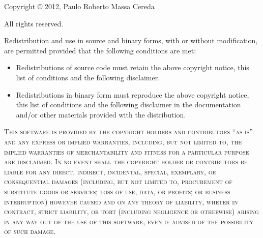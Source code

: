 \documentclass[a4paper,twoside,12pt]{memoir}
\begin{document}
\begin{infobox}[skipabove=\baselineskip plus 2pt minus 1pt]

\vspace{.5em}

\noindent Copyright \copyright{} 2012, Paulo Roberto Massa Cereda

\noindent All rights reserved.

\vspace{1em}

\noindent Redistribution and use in source and binary forms, with or without
modification, are permitted provided that the following conditions are met:

\begin{itemize}
\item Redistributions of source code must retain the above copyright notice, 
      this list of conditions and the following disclaimer.
\item Redistributions in binary form must reproduce the above copyright notice,
      this list of conditions and the following disclaimer in the documentation 
      and/or other materials provided with the distribution.
\end{itemize}

\vspace{1em}

\noindent\textsc{This software is provided by the copyright holders and 
contributors ``as is'' and any express or implied warranties, including, but not 
limited to, the implied warranties of merchantability and fitness for a 
particular purpose are disclaimed. In no event shall the copyright holder or 
contributors be liable for any direct, indirect, incidental, special, exemplary, 
or consequential damages (including, but not limited to, procurement of 
substitute goods or services; loss of use, data, or profits; or business 
interruption) however caused and on any theory of liability, wheter in contract, 
strict liability, or tort (including negligence or otherwise) arising in any way 
out of the use of this software, even if advised of the possibility of such 
damage.}
\end{infobox}

\cleardoublepage

\tableofcontents*
\end{document}
